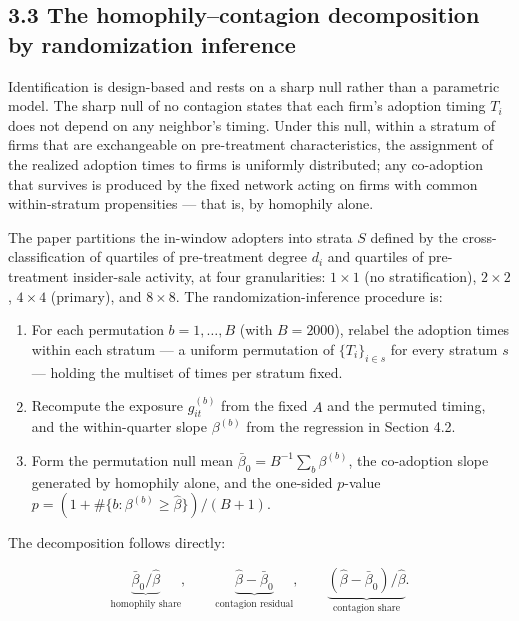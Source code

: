 \documentclass[
  a4paper,
]{article}
\providecommand{\tightlist}{%
  \setlength{\itemsep}{0pt}\setlength{\parskip}{0pt}}
\begin{document}
\subsection{3.3 The homophily--contagion decomposition by randomization
inference}\label{the-homophilycontagion-decomposition-by-randomization-inference}

Identification is design-based and rests on a sharp null rather than a
parametric model. The sharp null of no contagion states that each firm's
adoption timing \(T_i\) does not depend on any neighbor's timing. Under
this null, within a stratum of firms that are exchangeable on
pre-treatment characteristics, the assignment of the realized adoption
times to firms is uniformly distributed; any co-adoption that survives
is produced by the fixed network acting on firms with common
within-stratum propensities --- that is, by homophily alone.

The paper partitions the in-window adopters into strata \(S\) defined by
the cross-classification of quartiles of pre-treatment degree \(d_i\)
and quartiles of pre-treatment insider-sale activity, at four
granularities: \(1\times 1\) (no stratification), \(2\times 2\),
\(4\times 4\) (primary), and \(8\times 8\). The randomization-inference
procedure is:

\begin{enumerate}
\def\labelenumi{\arabic{enumi}.}
\tightlist
\item
  For each permutation \(b = 1, \dots, B\) (with \(B = 2000\)), relabel
  the adoption times within each stratum --- a uniform permutation of
  \(\{T_i\}_{i \in s}\) for every stratum \(s\) --- holding the multiset
  of times per stratum fixed.
\item
  Recompute the exposure \(g_{it}^{(b)}\) from the fixed \(A\) and the
  permuted timing, and the within-quarter slope \(\beta^{(b)}\) from the
  regression in Section 4.2.
\item
  Form the permutation null mean
  \(\bar\beta_0 = B^{-1} \sum_b \beta^{(b)}\), the co-adoption slope
  generated by homophily alone, and the one-sided \(p\)-value
  \(p = (1 + \#\{b : \beta^{(b)} \ge \hat\beta\}) / (B + 1)\).
\end{enumerate}

The decomposition follows directly:

\[ \underbrace{\bar\beta_0 / \hat\beta}_{\text{homophily share}}, \qquad \underbrace{\hat\beta - \bar\beta_0}_{\text{contagion residual}}, \qquad \underbrace{(\hat\beta - \bar\beta_0)/\hat\beta}_{\text{contagion share}}. \]
\end{document}

